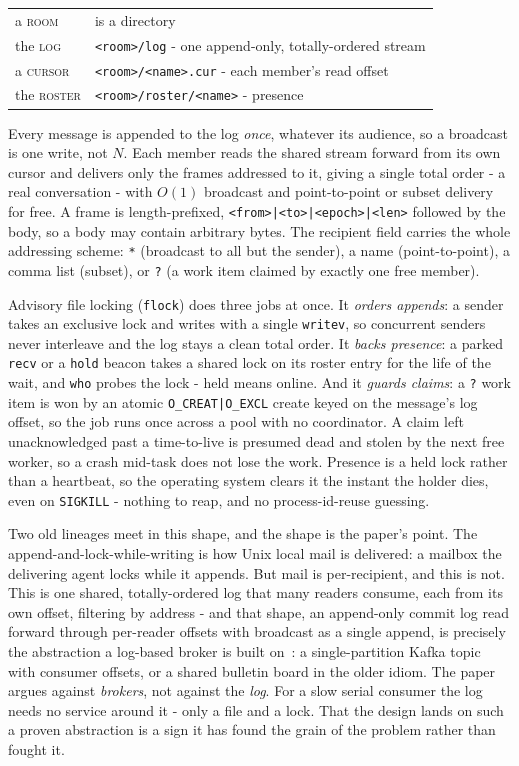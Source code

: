 \documentclass[11pt]{article}
\newcommand{\code}[1]{\texttt{#1}}
\begin{document}
\begin{center}
\begin{tabular}{@{}ll@{}}
\toprule
a \textsc{room}   & is a directory \\
the \textsc{log}  & \code{<room>/log} - one append-only, totally-ordered stream \\
a \textsc{cursor} & \code{<room>/<name>.cur} - each member's read offset \\
the \textsc{roster} & \code{<room>/roster/<name>} - presence \\
\bottomrule
\end{tabular}
\end{center}

Every message is appended to the log \emph{once}, whatever its audience, so a broadcast is one write, not $N$. Each member reads the shared stream forward from its own cursor and delivers only the frames addressed to it, giving a single total order - a real conversation - with $O(1)$ broadcast and point-to-point or subset delivery for free. A frame is length-prefixed, \code{<from>|<to>|<epoch>|<len>} followed by the body, so a body may contain arbitrary bytes. The recipient field carries the whole addressing scheme: \code{*} (broadcast to all but the sender), a name (point-to-point), a comma list (subset), or \code{?} (a work item claimed by exactly one free member).

Advisory file locking (\code{flock}) does three jobs at once. It \emph{orders appends}: a sender takes an exclusive lock and writes with a single \code{writev}, so concurrent senders never interleave and the log stays a clean total order. It \emph{backs presence}: a parked \code{recv} or a \code{hold} beacon takes a shared lock on its roster entry for the life of the wait, and \code{who} probes the lock - held means online. And it \emph{guards claims}: a \code{?} work item is won by an atomic \code{O\_CREAT|O\_EXCL} create keyed on the message's log offset, so the job runs once across a pool with no coordinator. A claim left unacknowledged past a time-to-live is presumed dead and stolen by the next free worker, so a crash mid-task does not lose the work. Presence is a held lock rather than a heartbeat, so the operating system clears it the instant the holder dies, even on \code{SIGKILL} - nothing to reap, and no process-id-reuse guessing.

Two old lineages meet in this shape, and the shape is the paper's point. The append-and-lock-while-writing is how Unix local mail is delivered: a mailbox the delivering agent locks while it appends. But mail is per-recipient, and this is not. This is one shared, totally-ordered log that many readers consume, each from its own offset, filtering by address - and that shape, an append-only commit log read forward through per-reader offsets with broadcast as a single append, is precisely the abstraction a log-based broker is built on~\cite{kreps}: a single-partition Kafka topic with consumer offsets, or a shared bulletin board in the older idiom. The paper argues against \emph{brokers}, not against the \emph{log}. For a slow serial consumer the log needs no service around it - only a file and a lock. That the design lands on such a proven abstraction is a sign it has found the grain of the problem rather than fought it.
\end{document}
